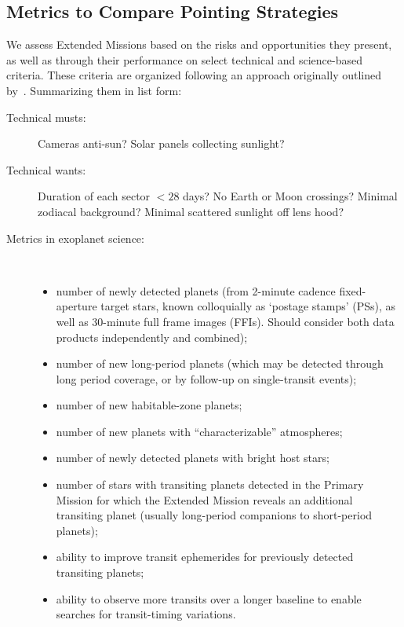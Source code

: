 \subsection{Metrics to Compare Pointing Strategies}
\label{sec:comparing_pointing_strategies}

We assess Extended Missions based on the risks and opportunities they
present, as well as through their performance on select technical and
science-based criteria.  These criteria are organized following an
approach originally outlined by~\citet{kepner_rational_1965}.
Summarizing them in list form:
\begin{description}
\item[Technical musts:] Cameras anti-sun? Solar panels collecting sunlight?
\item[Technical wants:] Duration of each sector $<28$ days? No Earth or Moon 
crossings? Minimal zodiacal background? Minimal scattered sunlight off lens 
hood?
\item[Metrics in exoplanet science:]\
	\begin{itemize}
	\item number of newly detected planets (from 2-minute cadence 
	fixed-aperture target stars, known colloquially as `postage stamps' (PSs), 
	as well as 30-minute full frame images (FFIs). Should consider 
	both data products independently and combined); 
	\item number of new long-period planets (which may be detected through long period coverage, or by follow-up on single-transit events); 
	\item number of new habitable-zone planets; 
	\item number of new planets with ``characterizable'' atmospheres; 
	\item number of newly detected planets with bright host stars; 
	\item number of stars with transiting planets detected in the Primary Mission for which the Extended Mission reveals an additional
          transiting planet (usually long-period companions to short-period planets);
        \item ability to improve transit ephemerides for previously detected transiting planets;
	\item ability to observe more transits over a longer baseline to enable searches for transit-timing variations.
        \end{itemize}
\end{description}

